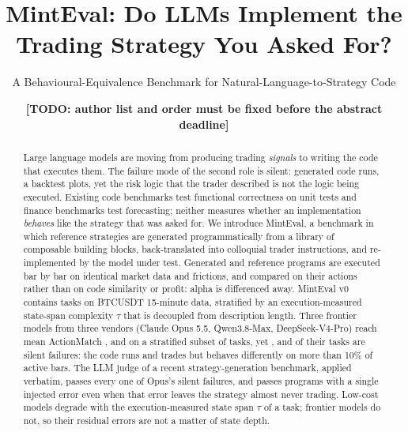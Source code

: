 \documentclass[sigconf,nonacm]{acmart}
\newcommand{\todo}[1]{{\color{red}\textbf{[TODO: #1]}}}
\begin{document}
\title{MintEval: Do LLMs Implement the Trading Strategy You Asked For?}
\subtitle{A Behavioural-Equivalence Benchmark for Natural-Language-to-Strategy Code}

\author{\todo{author list and order must be fixed before the abstract deadline}}
\affiliation{\institution{\todo{affiliation}}\country{}}

\begin{abstract}
Large language models are moving from producing trading \emph{signals} to writing the code that
executes them. The failure mode of the second role is silent: generated code runs, a backtest
plots, yet the risk logic that the trader described is not the logic being executed. Existing
code benchmarks test functional correctness on unit tests and finance benchmarks test forecasting;
neither measures whether an implementation \emph{behaves} like the strategy that was asked for.
We introduce MintEval, a benchmark in which reference strategies are generated programmatically
from a library of composable building blocks, back-translated into colloquial trader instructions,
and re-implemented by the model under test. Generated and reference programs are executed bar by
bar on identical market data and frictions, and compared on their actions rather than on code
similarity or profit: alpha is differenced away. MintEval v0 contains \NTasks{} tasks on BTCUSDT
15-minute data, stratified by an execution-measured state-span complexity $\tau$ that is decoupled
from description length. Three frontier models from three vendors (Claude Opus 5.5, Qwen3.8-Max, DeepSeek-V4-Pro) reach
mean ActionMatch \AMSubOpus, \AMSubQMax{} and \AMSubDSPro{} on a stratified subset of \NSub{} tasks, yet
\SilentSubOpus, \SilentSubQMax{} and \SilentSubDSPro{} of their tasks are silent failures: the code runs
and trades but behaves differently on more than 10\% of active bars. The LLM judge of a recent
strategy-generation benchmark, applied verbatim, passes every one of Opus's silent failures, and passes
programs with a single injected error even when that error leaves the strategy almost never trading.
Low-cost models degrade with the execution-measured state span $\tau$ of a task; frontier models do
not, so their residual errors are not a matter of state depth.
\end{abstract}
\end{document}
